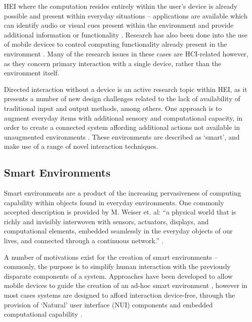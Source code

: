 \documentclass[oribibl,11pt]{llncs}
\begin{document}
HEI where the computation resides entirely within the user's device is already possible and present within everyday situations -- applications are available which can identify audio or visual cues present within the environment and provide additional information or functionality \cite{o2010older}. Research has also been done into the use of mobile devices to control computing functionality already present in the environment \cite{Lorenz:2009:UHD:1613858.1613882}. Many of the research issues in these cases are HCI-related however, as they concern primary interaction with a single device, rather than the environment itself.

Directed interaction without a device is an active research topic within HEI, as it presents a number of new design challenges related to the lack of availability of traditional input and output methods, among others. One approach is to augment everyday items with additional sensory and computational capacity, in order to create a connected system affording additional actions not available in unaugmented environments \cite{Schmidt:2002:UIU:1765426.1765451}. These environments are described as `smart', and make use of a range of novel interaction techniques.


\subsection{Smart Environments}		\label{sub:smart_environments}

Smart environments are a product of the increasing pervasiveness of computing capability within objects found in everyday environments. One commonly accepted description is provided by M. Weiser et. al: ``a physical world that is richly and invisibly interwoven with sensors, actuators, displays, and computational elements, embedded seamlessly in the everyday objects of our lives, and connected through a continuous network.'' \cite{weiser1999origins}.

A number of motivations exist for the creation of smart environments -- commonly, the purpose is to simplify human interaction with the previously disparate components of a system. Approaches have been developed to allow mobile devices to guide the creation of an ad-hoc smart environment \cite{Bartolini:2012:RNI:2387476.2387479}, however in most cases systems are designed to afford interaction device-free, through the provision of `Natural' user interface (NUI) components and embedded computational capability \cite{Heidrich:2013:DIS:2459236.2459248}.
\end{document}
